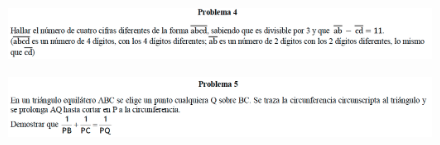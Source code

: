 \begin{figure}[H]
	\centering
	\includegraphics[width=\linewidth]{2020_05_23/imgs/OMAPA_2012_r5_A_4}
	\label{OMAPA_2012_r5_A_4}
\end{figure}

\begin{figure}[H]
	\centering
	\includegraphics[width=\linewidth]{2020_05_23/imgs/OMAPA_2012_r5_A_5}
	\label{OMAPA_2012_r5_A_5}
\end{figure}